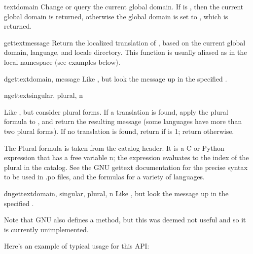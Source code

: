 \begin{funcdesc}{textdomain}{}
Change or query the current global domain.  If  is
, then the current global domain is returned, otherwise the
global domain is set to , which is returned.
\end{funcdesc}

\begin{funcdesc}{gettext}{message}
Return the localized translation of , based on the
current global domain, language, and locale directory.  This function
is usually aliased as \function{_} in the local namespace (see
examples below).
\end{funcdesc}

\begin{funcdesc}{dgettext}{domain, message}
Like , but look the message up in the specified
.
\end{funcdesc}

\begin{funcdesc}{ngettext}{singular, plural, n}

Like , but consider plural forms. If a translation
is found, apply the plural formula to , and return the
resulting message (some languages have more than two plural forms).
If no translation is found, return  if  is 1;
return  otherwise.

The Plural formula is taken from the catalog header. It is a C or
Python expression that has a free variable n; the expression evaluates
to the index of the plural in the catalog. See the GNU gettext
documentation for the precise syntax to be used in .po files, and the
formulas for a variety of languages.


\end{funcdesc}

\begin{funcdesc}{dngettext}{domain, singular, plural, n}
Like , but look the message up in the specified
.

\end{funcdesc}


Note that GNU  also defines a 
method, but this was deemed not useful and so it is currently
unimplemented.

Here's an example of typical usage for this API:

